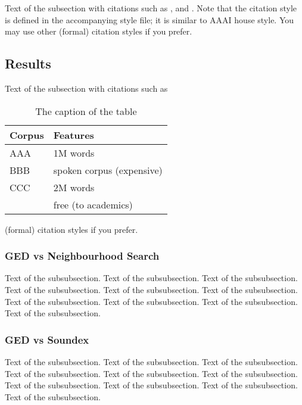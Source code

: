 \documentclass[11pt]{article}
\begin{document}
Text of the subsection with citations such as 
,  and .
Note that the citation style is defined in the accompanying
style file; it is similar to AAAI house style. You may use
other (formal) citation styles if you prefer.


\subsection{Results}

Text of the subsection with citations such as 
\begin{table}[h]
 \begin{center}
\begin{tabular}{|l|l|}

      \hline
      Corpus & Features\\
      \hline\hline
      AAA & 1M words\\
      BBB & spoken corpus (expensive)\\
      CCC & 2M words\\
        & free (to academics)\\
      \hline

\end{tabular}
\caption{The caption of the table}\label{table1}
 \end{center}
\end{table}

 (formal) citation styles if you prefer.


\subsubsection{GED vs Neighbourhood Search}

Text of the subsubsection.
Text of the subsubsection.
Text of the subsubsection.
Text of the subsubsection.
Text of the subsubsection.
Text of the subsubsection.
Text of the subsubsection.
Text of the subsubsection.
Text of the subsubsection.
Text of the subsubsection.
 
\subsubsection{GED vs Soundex}

Text of the subsubsection.
Text of the subsubsection.
Text of the subsubsection.
Text of the subsubsection.
Text of the subsubsection.
Text of the subsubsection.
Text of the subsubsection.
Text of the subsubsection.
Text of the subsubsection.
Text of the subsubsection.
\end{document}

